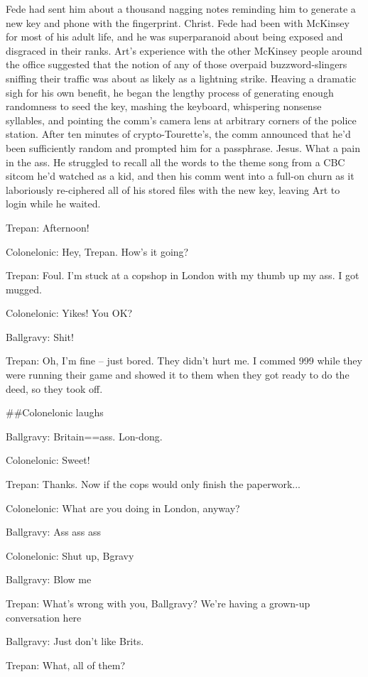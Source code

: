 Fede had sent him about a thousand nagging notes reminding him to
generate a new key and phone with the fingerprint. Christ. Fede had
been with McKinsey for most of his adult life, and he was
superparanoid about being exposed and disgraced in their ranks.
Art’s experience with the other McKinsey people around the office
suggested that the notion of any of those overpaid
buzzword-slingers sniffing their traffic was about as likely as a
lightning strike. Heaving a dramatic sigh for his own benefit, he
began the lengthy process of generating enough randomness to seed
the key, mashing the keyboard, whispering nonsense syllables, and
pointing the comm’s camera lens at arbitrary corners of the police
station. After ten minutes of crypto-Tourette’s, the comm announced
that he’d been sufficiently random and prompted him for a
passphrase. Jesus. What a pain in the ass. He struggled to recall
all the words to the theme song from a CBC sitcom he’d watched as a
kid, and then his comm went into a full-on churn as it laboriously
re-ciphered all of his stored files with the new key, leaving Art
to login while he waited.

Trepan: Afternoon!

Colonelonic: Hey, Trepan. How's it going?

Trepan: Foul. I'm stuck at a copshop in London with my thumb up my
ass. I got mugged.

Colonelonic: Yikes! You OK?

Ballgravy: Shit!

Trepan: Oh, I'm fine -- just bored. They didn't hurt me. I commed
999 while they were running their game and showed it to them when
they got ready to do the deed, so they took off.

\#\#Colonelonic laughs

Ballgravy: Britain==ass. Lon-dong.

Colonelonic: Sweet!

Trepan: Thanks. Now if the cops would only finish the paperwork...

Colonelonic: What are you doing in London, anyway?

Ballgravy: Ass ass ass

Colonelonic: Shut up, Bgravy

Ballgravy: Blow me

Trepan: What's wrong with you, Ballgravy? We're having a grown-up
conversation here

Ballgravy: Just don't like Brits.

Trepan: What, all of them?

